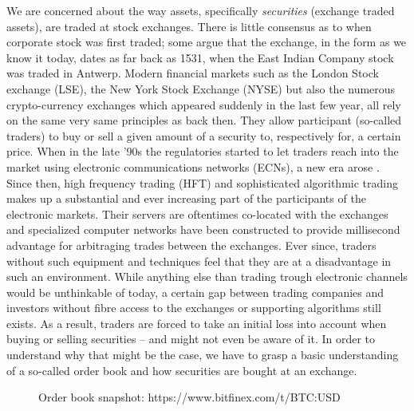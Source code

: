 We are concerned about the way assets, specifically \textit{securities} (exchange traded assets), are traded at stock exchanges.
There is little consensus as to when corporate stock was first traded; some argue that the exchange, in the form as we know it today, dates as far back as 1531, when the East Indian Company stock was traded in Antwerp\cite{stock-exchange}.
Modern financial markets such as the London Stock exchange (LSE), the New York Stock Exchange (NYSE) but also the numerous crypto-currency exchanges which appeared suddenly in the last few year, all rely on the same very same principles as back then.
They allow participant (so-called traders) to buy or sell a given amount of a security to, respectively for, a certain price.
When in the late '90s the regulatories started to let traders reach into the market using electronic communications networks (ECNs), a new era arose \cite{patterson2012dark}.
Since then, high frequency trading (HFT) and sophisticated algorithmic trading makes up a substantial and ever increasing part of the participants of the electronic markets.
Their servers are oftentimes co-located with the exchanges and specialized computer networks have been constructed to provide millisecond advantage for arbitraging trades between the exchanges.
Ever since, traders without such equipment and techniques feel that they are at a disadvantage in such an environment. \cite{patterson2012dark}
While anything else than trading trough electronic channels would be unthinkable of today, a certain gap between trading companies and investors without fibre access to the exchanges or supporting algorithms still exists.
As a result, traders are forced to take an initial loss into account when buying or selling securities -- and might not even be aware of it.
In order to understand why that might be the case, we have to grasp a basic understanding of a so-called order book and how securities are bought at an exchange.

\begin{figure}[H]
    \centering
    \caption{Order book snapshot: https://www.bitfinex.com/t/BTC:USD}
    \label{fig:intro-orderbook}
\end{figure}

